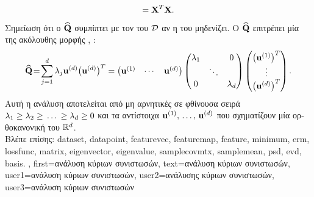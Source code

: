 {{$$		={\bf X}^{T} {\bf X}.$$ 
		\foreignlanguage{greek}{Σημείωση ότι ο} $\widehat{\mathbf{Q}}$ \foreignlanguage{greek}{συμπίπτει με τον}  
		\foreignlanguage{greek}{του $\mathcal{D}$ αν η}  \foreignlanguage{greek}{του μηδενίζει. Ο}  
		 $\widehat{\mathbf{Q}}$ \foreignlanguage{greek}{επιτρέπει μία}  \foreignlanguage{greek}{της 
		ακόλουθης μορφής} \cite{HornMatAnalysis}, \cite{MeyerMatrixAnalysis}:
		$$\widehat{\mathbf{Q}}\!=\!\sum_{j=1}^{d} \lambda_{j} 
			\mathbf{u}^{(d)} \big( \mathbf{u}^{(d)} \big)^{T}=
			\begin{pmatrix}
			\mathbf{u}^{(1)} & \cdots & \mathbf{u}^{(d)}
			\end{pmatrix}
			\begin{pmatrix}
			\lambda_{1}        &        & 0 \\
			& \ddots &   \\
			0                 &        & \lambda_{d}
			\end{pmatrix}
			\begin{pmatrix}
			\big(\mathbf{u}^{(1)}\big)^{T} \\
			\vdots                         \\
			\big(\mathbf{u}^{(d)}\big)^{T}
		\end{pmatrix}.$$
		\foreignlanguage{greek}{Αυτή η ανάλυση αποτελείται από μη αρνητικές}  \foreignlanguage{greek}{σε 
		φθίνουσα σειρά $\lambda_{1} \geq \lambda_{2} \geq \,\ldots \,\geq \lambda_{d} \geq 0$ και τα αντίστοιχα}  
		$\mathbf{u}^{(1)},\,\ldots,\,\mathbf{u}^{(d)}$ \foreignlanguage{greek}{που σχηματίζουν μία ορθοκανονική}  
		\foreignlanguage{greek}{του} $\mathbb{R}^{d}$.
		\\
		\foreignlanguage{greek}{Βλέπε επίσης:} \gls{dataset}, \gls{datapoint}, \gls{featurevec}, \gls{featuremap}, \gls{feature}, \gls{minimum},
		\gls{erm}, \gls{lossfunc}, \gls{matrix}, \gls{eigenvector}, \gls{eigenvalue}, \gls{samplecovmtx}, \gls{samplemean}, \gls{psd}, \gls{evd}, \gls{basis}. },
	first={\foreignlanguage{greek}{ανάλυση κύριων συνιστωσών}},
	text={\foreignlanguage{greek}{ανάλυση κύριων συνιστωσών}},
	user1={\foreignlanguage{greek}{ανάλυση κύριων συνιστωσών}}, %
	user2={\foreignlanguage{greek}{ανάλυσης κύριων συνιστωσών}}, %
	user3={\foreignlanguage{greek}{ανάλυση κύριων συνιστωσών}} %
}

